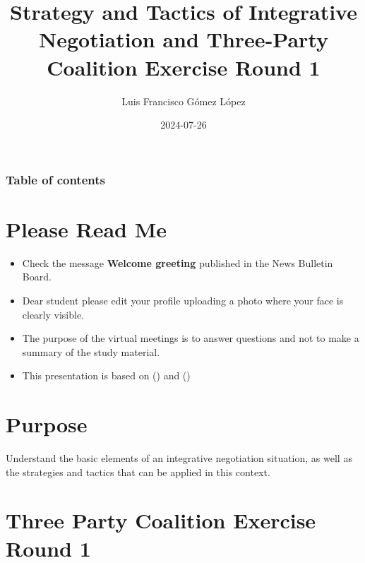 \documentclass[
  ignorenonframetext,
]{beamer}
\title{Strategy and Tactics of Integrative Negotiation and Three-Party
Coalition Exercise Round 1}
\author{Luis Francisco Gómez López}
\date{2024-07-26}
\institute{FAEDIS}
\renewcommand*\contentsname{Table of contents}
\newcommand\contentsname{Table of contents}
\begin{document}
\frame{\titlepage}

\renewcommand*\contentsname{Table of contents}
\begin{frame}[allowframebreaks]
  \frametitle{Table of contents}
  \tableofcontents[hideallsubsections]
\end{frame}

\section{Please Read Me}\label{please-read-me}

\begin{frame}{}
\label{section}
\begin{itemize}
\item
  Check the message \textbf{Welcome greeting} published in the News
  Bulletin Board.
\item
  Dear student please edit your profile uploading a photo where your
  face is clearly visible.
\item
  The purpose of the virtual meetings is to answer questions and not to
  make a summary of the study material.
\item
  This presentation is based on
  () and
  ()
\end{itemize}
\end{frame}

\section{Purpose}\label{purpose}

\begin{frame}{}
\label{section-1}
Understand the basic elements of an integrative negotiation situation,
as well as the strategies and tactics that can be applied in this
context.
\end{frame}

\section{Three Party Coalition Exercise Round
1}\label{three-party-coalition-exercise-round-1}
\end{document}
